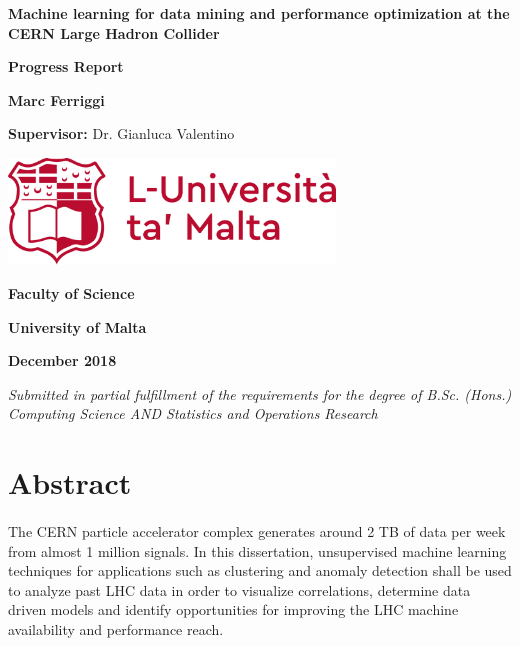 \documentclass[12pt,a4paper,final]{report}
\begin{document}
	\begin{titlepage}
		\centering
		{\LARGE\bfseries Machine learning for data mining and performance optimization at the CERN Large Hadron Collider \par}
		\vspace{.5cm}
		
		{\Large \textbf{Progress Report} \par}
		\vspace{.5cm}
		
		{\large \textbf{Marc Ferriggi}\par}
		\vspace{0.5cm}
		
		{\large \textbf{Supervisor:} Dr. Gianluca Valentino\par}
		\vfill
		
		\includegraphics[width=0.65\textwidth]{UoMLogo}\par
		\vfill
		
		{\large\bfseries Faculty of Science \par}
		{\large\bfseries University of Malta \par}
		{\large\bfseries December 2018 \par}
		
		\vspace{1cm}
		\textit{Submitted in partial fulfillment of the requirements for the degree of B.Sc. (Hons.) Computing Science AND Statistics and Operations Research}
	\end{titlepage}
	
	\tableofcontents
	\pagebreak
	
	\section{Abstract}
	\paragraph{ }The CERN particle accelerator complex generates around 2 TB of data per week from almost 1 million signals. In this dissertation, unsupervised machine learning techniques for applications such as clustering and anomaly detection shall be used to analyze past LHC data in order to visualize correlations, determine data driven models and identify opportunities for improving the LHC machine availability and performance reach.
	
\end{document}
